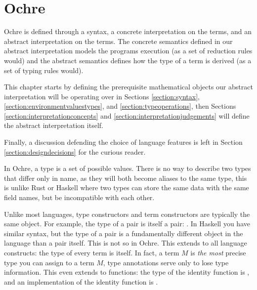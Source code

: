 \documentclass[12pt,twoside]{report}
\begin{document}

\cleardoublepage
\chapter{Ochre}
\label{chapter:ochreformally}

Ochre is defined through a syntax, a concrete interpretation on the terms, and an abstract interpretation on the terms. The concrete semantics defined in our abstract interpretation models the programs execution (as a set of reduction rules would) and the abstract semantics defines how the type of a term is derived (as a set of typing rules would).

This chapter starts by defining the prerequisite mathematical objects our abstract interpretation will be operating over in Sections \ref{section:syntax}, \ref{section:environmentvaluestypes}, and \ref{section:typeoperations}, then Sections \ref{section:interpretationconcepts} and \ref{section:interpretationjudgements} will define the abstract interpretation itself.

Finally, a discussion defending the choice of language features is left in Section \ref{section:designdecisions} for the curious reader.

In Ochre, a type is a set of possible values. There is no way to describe two types that differ only in name, as they will both become aliases to the same type, this is unlike Rust or Haskell where two types can store the same data with the same field names, but be incompatible with each other.

Unlike most languages, type constructors and term constructors are typically the same object. For example, the type of a pair is itself a pair: . In Haskell you have similar syntax, but the type of a pair is a fundamentally different object in the language than a pair itself. This is not so in Ochre. This extends to all language constructs: the type of every term is itself. In fact, a term $M$ is \textit{the most} precise type you can assign to a term $M$, type annotations serve only to lose type information. This even extends to functions: the type of the identity function is , and an implementation of the identity function is .
\end{document}
